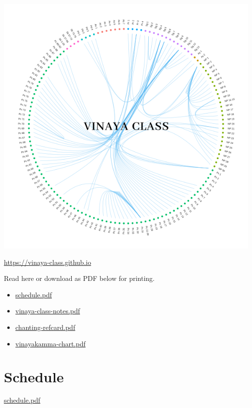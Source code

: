 \includegraphics{../../src/includes/figures/vinaya-class-title.png}

\url{https://vinaya-class.github.io}

Read here or download as PDF below for printing.

\begin{itemize}
\tightlist
\item
  \href{./includes/docs/schedule.pdf}{schedule.pdf}
\item
  \href{./includes/docs/vinaya-class-notes.pdf}{vinaya-class-notes.pdf}
\item
  \href{./includes/docs/chanting-refcard.pdf}{chanting-refcard.pdf}
\item
  \href{./includes/docs/vinayakamma-chart.pdf}{vinayakamma-chart.pdf}
\end{itemize}

\section{Schedule}

\href{./includes/docs/schedule.pdf}{schedule.pdf}

